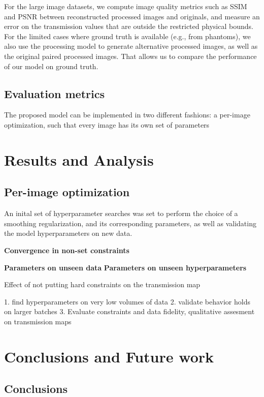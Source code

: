 \documentclass[nomenclature, english, bibtex]{kththesis}
\numberwithin{listing}{chapter}
\begin{document}
For the large image datasets, we compute image quality metrics such as SSIM and PSNR between reconstructed processed
images and originals, and measure an error on the transmission values that are outside the restricted physical bounds.
For the limited cases where ground truth is available (e.g., from phantoms), we also use the processing model to generate
alternative processed images, as well as the original paired processed images. That allows us to compare the
performance of our model on ground truth.


\section{Evaluation metrics}

The proposed model can be implemented in two different fashions: a per-image optimization, such that every image has its own
set of parameters
\chapter{Results and Analysis}
\label{ch:resultsAndAnalysis}


\section{Per-image optimization}

An inital set of hyperparameter searches was set to perform the choice of a smoothing regularization, and
its corresponding parameters, as well as validating the model hyperparameters on new data.

\textbf{Convergence in non-set constraints}

\textbf{Parameters on unseen data}
\textbf{Parameters on unseen hyperparameters}


Effect of not putting hard constraints on the transmission map



1. find hyperparameters on very low volumes of data
2. validate behavior holds on larger batches
3. Evaluate constraints and data fidelity, qualitative assesment on transmission maps



\cleardoublepage
\chapter{Conclusions and Future work}
\label{ch:conclusionsAndFutureWork}

\section{Conclusions}
\label{sec:conclusions}
\end{document}
